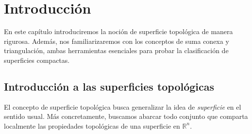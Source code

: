 \documentclass[a4paper,11pt,spanish, twoside, leqno]{tfg-uam}
\theoremstyle{definition}
\begin{document}
\begin{abstract}[english]
This essay contains a mathematical approach to topological surfaces and their classification:

Firstly, basic notions of compact surfaces will be introduced, from which a proof of their classification up to homeomorphism will be given. As a result, we will find that any compact surface is homeomorphic either to: a sphere, or a  finite \textit{connected sum} of tori, or a finite \textit{connected sum} of projective planes.

Subsequently, we will proceed to study  Kerékjártó's theorem, which provides a classification without the hypothesis of compactness. To continue, we will require to introduce the concept of ideal boundary, a topological invariant that describes how  a surface may scape to infinity. The theorem will assert that any second countable surface is topologically determined by its `genus', `orientability class' and ideal boundary.

Furthermore, we will provide a representative surface for each equivalence class of the classification. As it will be shown, the ideal boundary of an arbitrary surface is homeomorphic to a closed subset of the Cantor set. As a sort of reciprocate, we will study a theorem proved by Richards: given a closed subset of the Cantor set, one ca construct a surface which has this set as ideal boundary. From this construction a simple observation will suffice to provide representatives for the classification. Lastly, we will briefly discuss the cardinality of non-homeomorphic surfaces.
\end{abstract}





\mainmatter
\chapter{Introducción}
En este capítulo introduciremos la noción de superficie topológica de manera rigurosa. Además, nos familiarizaremos con los conceptos de suma conexa y triangulación, ambas herramientas esenciales para probar la clasificación de superficies compactas.
\section{Introducci\'on a las superficies topológicas}
El concepto de superficie topológica busca generalizar la idea de \textit{superficie} en el sentido usual. Más concretamente, buscamos abarcar todo conjunto que comparta localmente las propiedades topológicas de una superficie en $\mathbb{R}^n$. 
\end{document}
